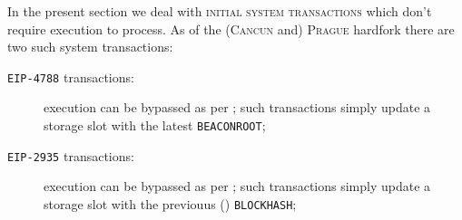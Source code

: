 In the present section we deal with \textsc{initial system transactions} which don't require \evm{} execution to process.
As of the (\textsc{Cancun} and) \textsc{Prague} hardfork there are two such system transactions:
\begin{description}
	\item[\texttt{EIP-4788} transactions:]
		\evm{} execution can be bypassed as per \cite{EIP-4788};
		such transactions simply update a storage slot with the latest \texttt{BEACONROOT};
	\item[\texttt{EIP-2935} transactions:]
		\evm{} execution can be bypassed as per \cite{EIP-2935};
		such transactions simply update a storage slot with the previouus (\linea) \texttt{BLOCKHASH};
\end{description}
